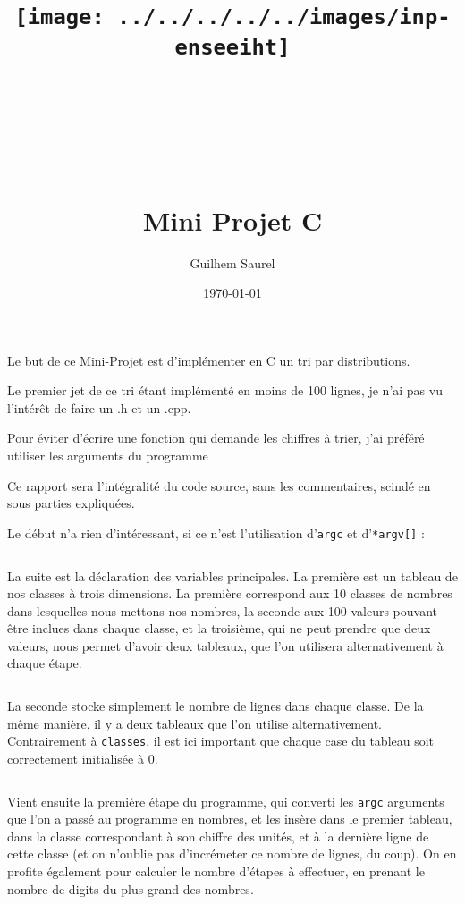 \documentclass[10pt]{article}
\title{\texttt{[image: ../../../../../images/inp-enseeiht]} \\ ~ \\ ~ \\ ~ \\ ~ \\ Mini Projet C }
\author{Guilhem Saurel}
\date{\today}
\begin{document}
  \maketitle

 Le but de ce Mini-Projet est d'implémenter en C un tri par distributions.

 Le premier jet de ce tri étant implémenté en moins de 100 lignes, je n'ai pas vu l'intérêt de faire un .h et un .cpp.

 Pour éviter d'écrire une fonction qui demande les chiffres à trier, j'ai préféré utiliser les arguments du programme

 Ce rapport sera l'intégralité du code source, sans les commentaires, scindé en sous parties expliquées.

 Le début n'a rien d'intéressant, si ce n'est l'utilisation d'\verb|argc| et d'\verb|*argv[]| :

  \inputminted[linenos,lastline=7]{cpp}{../src/main.cpp}

  La suite est la déclaration des variables principales. La première est un tableau de nos classes à trois dimensions. La première correspond aux 10 classes de nombres dans lesquelles nous mettons nos nombres, la seconde aux 100 valeurs pouvant être inclues dans chaque classe, et la troisième, qui ne peut prendre que deux valeurs, nous permet d'avoir deux tableaux, que l'on utilisera alternativement à chaque étape.

  \inputminted[linenos,firstnumber=9,firstline=9,lastline=9]{cpp}{../src/main.cpp}

  La seconde stocke simplement le nombre de lignes dans chaque classe. De la même manière, il y a deux tableaux que l'on utilise alternativement. Contrairement à \verb|classes|, il est ici important que chaque case du tableau soit correctement initialisée à 0.

  \inputminted[linenos,firstnumber=10,firstline=10,lastline=14]{cpp}{../src/main.cpp}

  Vient ensuite la première étape du programme, qui converti les \verb|argc| arguments que l'on a passé au programme en nombres, et les insère dans le premier tableau, dans la classe correspondant à son chiffre des unités, et à la dernière ligne de cette classe (et on n'oublie pas d'incrémeter ce nombre de lignes, du coup). On en profite également pour calculer le nombre d'étapes à effectuer, en prenant le nombre de digits du plus grand des nombres.
\end{document}

